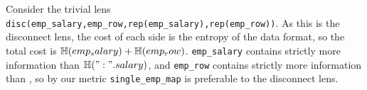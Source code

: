 \documentclass[acmsmall,screen,anonymous]{acmart}
\begin{document}
%
%

Consider the trivial lens
\lstinline{disc(emp_salary,emp_row,rep(emp_salary),rep(emp_row))}. As this is
the disconnect lens, the cost of each side is the entropy of the data format, so
the total cost is $\EntropyOf{\lstinline{emp_salary} } +
\EntropyOf{\lstinline{emp_row}}$. \lstinline{emp_salary} contains strictly more
information than $\EntropyOf{\lstinline{": " . salary}}$, and
\lstinline{emp_row} contains strictly more information than
, so by our metric
\lstinline{single_emp_map} is preferable to the disconnect lens.
\end{document}
